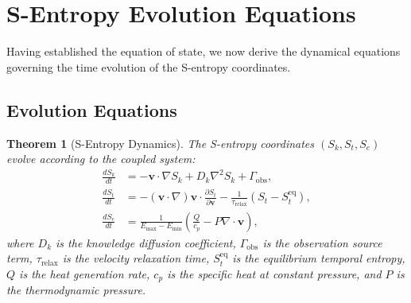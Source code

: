 \documentclass[twocolumn,10pt]{article}
\newtheorem{theorem}{Theorem}[section]
\newcommand{\Sk}{S_k}
\newcommand{\St}{S_t}
\newcommand{\Se}{S_e}
\newcommand{\trelax}{\tau_{\mathrm{relax}}}
\newcommand{\Emax}{E_{\mathrm{max}}}
\newcommand{\Emin}{E_{\mathrm{min}}}
\begin{document}
\section{S-Entropy Evolution Equations}\label{sec:evolution}

Having established the equation of state, we now derive the dynamical equations governing the time evolution of the S-entropy coordinates.

\subsection{Evolution Equations}

\begin{theorem}[S-Entropy Dynamics]\label{thm:dynamics}
The S-entropy coordinates $(\Sk, \St, \Se)$ evolve according to the coupled system:
\begin{align}
\frac{d\Sk}{dt} &= -\mathbf{v} \cdot \nabla \Sk + D_k \nabla^2 \Sk + \Gamma_{\mathrm{obs}}, \label{eq:dSk}\\
\frac{d\St}{dt} &= -(\mathbf{v} \cdot \nabla)\mathbf{v} \cdot \frac{\partial \St}{\partial \mathbf{v}} - \frac{1}{\trelax}(\St - \St^{\mathrm{eq}}), \label{eq:dSt}\\
\frac{d\Se}{dt} &= \frac{1}{\Emax - \Emin}\left(\frac{Q}{c_p} - P \nabla \cdot \mathbf{v}\right), \label{eq:dSe}
\end{align}
where $D_k$ is the knowledge diffusion coefficient, $\Gamma_{\mathrm{obs}}$ is the observation source term, $\trelax$ is the velocity relaxation time, $\St^{\mathrm{eq}}$ is the equilibrium temporal entropy, $Q$ is the heat generation rate, $c_p$ is the specific heat at constant pressure, and $P$ is the thermodynamic pressure.
\end{theorem}
\end{document}
